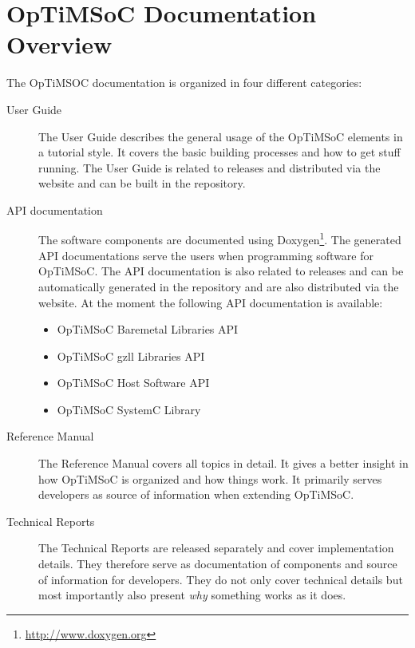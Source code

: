 
\section*{OpTiMSoC Documentation Overview}

The OpTiMSOC documentation is organized in four different categories:

\begin{description}
\item[User Guide] The User Guide describes the general usage of the
  OpTiMSoC elements in a tutorial style. It covers the basic building
  processes and how to get stuff running. The User Guide is related to
  releases and distributed via the website and can be built in the
  repository. 
\item[API documentation] The software components are documented using
  Doxygen\footnote{\url{http://www.doxygen.org}}. The generated API
  documentations serve the users when programming software for
  OpTiMSoC. The API documentation is also related to releases and can
  be automatically generated in the repository and are also
  distributed via the website. At the moment the following API
  documentation is available:
  \begin{itemize}
  \item OpTiMSoC Baremetal Libraries API
  \item OpTiMSoC gzll Libraries API
  \item OpTiMSoC Host Software API
  \item OpTiMSoC SystemC Library
  \end{itemize}
\item[Reference Manual] The Reference Manual covers all topics in
  detail. It gives a better insight in how OpTiMSoC is organized and
  how things work. It primarily serves developers as source of
  information when extending OpTiMSoC.
\item[Technical Reports] The Technical Reports are released separately
  and cover implementation details. They therefore serve as
  documentation of components and source of information for
  developers. They do not only cover technical details but most
  importantly also present \emph{why} something works as it does.
\end{description}